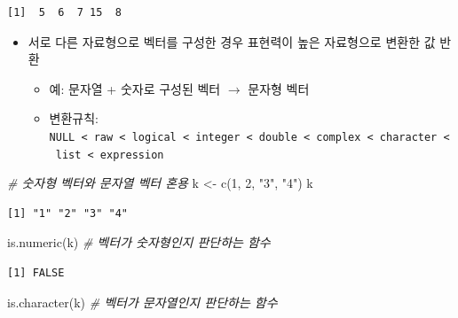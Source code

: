 \documentclass[
  11pt,
]{krantz}
\newenvironment{Shaded}{\begin{snugshade}}{\end{snugshade}}
\newcommand{\CommentTok}[1]{\textcolor[rgb]{0.37,0.37,0.37}{\textit{#1}}}
\newcommand{\DecValTok}[1]{\textcolor[rgb]{0.06,0.06,0.06}{#1}}
\newcommand{\FunctionTok}[1]{\textcolor[rgb]{0,0,0}{#1}}
\newcommand{\NormalTok}[1]{#1}
\newcommand{\OtherTok}[1]{\textcolor[rgb]{0.37,0.37,0.37}{#1}}
\newcommand{\StringTok}[1]{\textcolor[rgb]{0.5,0.5,0.5}{#1}}
\providecommand{\tightlist}{%
  \setlength{\itemsep}{0pt}\setlength{\parskip}{0pt}}
\begin{document}
\begin{verbatim}
[1]  5  6  7 15  8
\end{verbatim}

\normalsize

\begin{itemize}
\tightlist
\item
  서로 다른 자료형으로 벡터를 구성한 경우 표현력이 높은 자료형으로 변환한 값 반환

  \begin{itemize}
  \tightlist
  \item
    예: 문자열 + 숫자로 구성된 벡터 \(\rightarrow\) 문자형 벡터
  \item
    변환규칙: \texttt{NULL\ \textless{}\ raw\ \textless{}\ logical\ \textless{}\ integer\ \textless{}\ double\ \textless{}\ complex\ \textless{}\ character\ \textless{}\ list\ \textless{}\ expression}
  \end{itemize}
\end{itemize}

\footnotesize

\begin{Shaded}
\begin{Highlighting}[]
\CommentTok{\# 숫자형 벡터와 문자열 벡터 혼용}
\NormalTok{k }\OtherTok{\textless{}{-}} \FunctionTok{c}\NormalTok{(}\DecValTok{1}\NormalTok{, }\DecValTok{2}\NormalTok{, }\StringTok{"3"}\NormalTok{, }\StringTok{"4"}\NormalTok{)}
\NormalTok{k}
\end{Highlighting}
\end{Shaded}

\begin{verbatim}
[1] "1" "2" "3" "4"
\end{verbatim}

\begin{Shaded}
\begin{Highlighting}[]
\FunctionTok{is.numeric}\NormalTok{(k) }\CommentTok{\# 벡터가 숫자형인지 판단하는 함수}
\end{Highlighting}
\end{Shaded}

\begin{verbatim}
[1] FALSE
\end{verbatim}

\begin{Shaded}
\begin{Highlighting}[]
\FunctionTok{is.character}\NormalTok{(k) }\CommentTok{\# 벡터가 문자열인지 판단하는 함수}
\end{Highlighting}
\end{Shaded}
\end{document}
